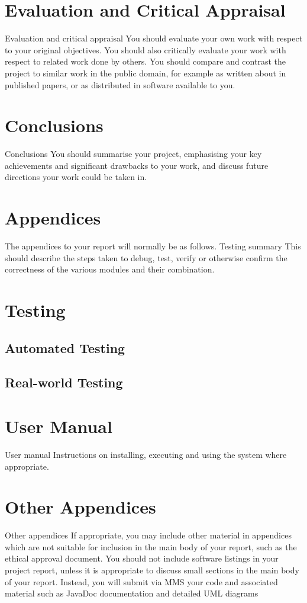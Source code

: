 \documentclass[11pt,a4paper,notitlepage]{report}
\begin{document}
	\section{Evaluation and Critical Appraisal}
	Evaluation and
	critical
	appraisal
	You should evaluate your own work with respect to
	your original objectives. You should also critically
	evaluate your work with respect to related work done
	by others. You should compare and contrast the project
	to similar work in the public domain, for example as
	written about in published papers, or as distributed in
	software available to you.
	
	\section{Conclusions}
	Conclusions
	You should summarise your project, emphasising your
	key achievements and significant drawbacks to your
	work, and discuss future directions your work could be
	taken in.
	
	\section{Appendices}
	The appendices to your report will normally be as follows.
	Testing
	summary
	This should describe the steps taken to debug, test,
	verify or otherwise confirm the correctness of the
	various modules and their combination.
	
	\section{Testing}
	\subsection{Automated Testing}
	\subsection{Real-world Testing}
	
	\section{User Manual}
	User manual Instructions on installing, executing and using the
	system where appropriate.
	
	\section{Other Appendices}
	Other
	appendices
	If appropriate, you may include other material in
	appendices which are not suitable for inclusion in the
	main body of your report, such as the ethical approval
	document.
	You should not include software listings in your project report, unless it is
	appropriate to discuss small sections in the main body of your report. Instead,
	you will submit via MMS your code and associated material such as JavaDoc
	documentation and detailed UML diagrams
	
\end{document}
